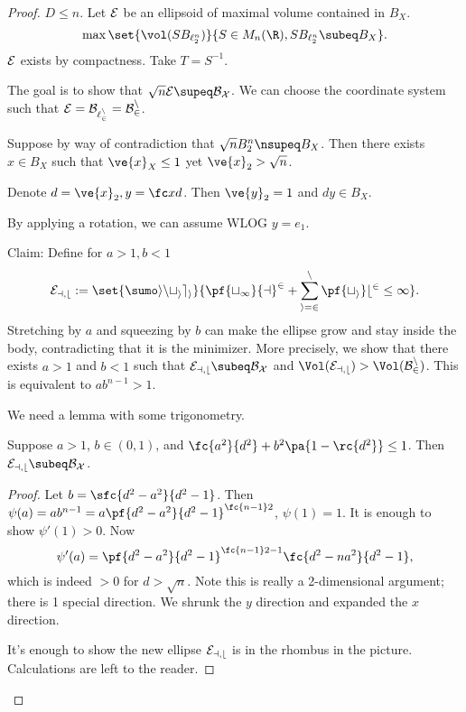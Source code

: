 \begin{proof}
\Wog{} $D\le n$. 
Let $\cal E$ be an ellipsoid of maximal volume contained in $B_X$. 
\[
\max\set{\vol(SB_{\ell_2^n})}{S\in M_n(\R), SB_{\ell_2^n} \subeq B_X}.
\]
$\cal E$ exists by compactness. 
Take $T=S^{-1}$. 

The goal is to show that $\sqrt n \cal E\supeq B_X$. We can choose the coordinate system such that $\cal E=B_{\ell_2^n}=B_2^n$.

Suppose by way of contradiction that $\sqrt nB_2^n\nsupeq B_X$. Then there exists $x\in B_X$ such that $\ve{x}_X\le 1$ yet $\ve{x}_2>\sqrt n$. %


Denote $d=\ve{x}_2, y=\fc xd$. Then $\ve{y}_2=1$ and $dy \in B_X$. 

By applying a rotation, we can assume WLOG $y=e_1$. 

Claim: Define for $a>1,b<1$ %
\[
\cal E_{a,b} :=\set{\sumo in t_ie_i}{\pf{t_1}{a}^2 + \sum_{i=2}^n \pf{t_i}b^2 \le 1}.
\]
Stretching by $a$ and squeezing by $b$ can make the ellipse  grow and stay inside the body, contradicting that it is the minimizer.
More precisely, we show that there exists $a>1$ and $b<1$ such that $\cal E_{a,b}\subeq B_X$ and $\Vol(\cal E_{a,b}) > \Vol(B_2^n)$. This is equivalent to $ab^{n-1}>1$.

We need a lemma with some trigonometry.
\begin{lem}
Suppose $a>1$, $b\in (0,1)$, and $\fc{a^2}{d^2}+b^2\pa{1-\rc{d^2}} \le 1$. Then $\cal E_{a,b}\subeq B_X$.
\end{lem}
\begin{proof}
Let $b=\sfc{d^2-a^2}{d^2-1}$. Then $\psi(a)=ab^{n-1}=a\pf{d^2-a^2}{d^2-1}^{\fc{n-1}2}$, $\psi(1) = 1$. It is enough to show $\psi'(1)>0$. Now 
\[
\psi'(a) =\pf{d^2-a^2}{d^2-1}^{\fc{n-1}2-1} \fc{d^2-na^2}{d^2-1},
\]
which is indeed $>0$ for $d>\sqrt n$. 
Note this is really a 2-dimensional argument; there is 1 special direction. We shrunk the $y$ direction and expanded the $x$ direction. 

It's enough to show the new ellipse $\cal E_{a,b}$ is in the rhombus in the picture. Calculations are left to the reader. %

\end{proof}
\end{proof}

